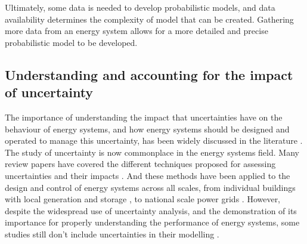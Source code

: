 Ultimately, some data is needed to develop probabilistic models, and data availability determines the complexity of model that can be created. Gathering more data from an energy system allows for a more detailed and precise probabilistic model to be developed.



\subsection{Understanding and accounting for the impact of uncertainty} \label{sec:uncertainty-methods-lit}


The importance of understanding the impact that uncertainties have on the behaviour of energy systems, and how energy systems should be designed and operated to manage this uncertainty, has been widely discussed in the literature . The study of uncertainty is now commonplace in the energy systems field. Many review papers have covered the different techniques proposed for assessing uncertainties and their impacts . And these methods have been applied to the design and control of energy systems across all scales, from individual buildings with local generation and storage , to national scale power grids .
However, despite the widespread use of uncertainty analysis, and the demonstration of its importance for properly understanding the performance of energy systems, some studies still don't include uncertainties in their modelling .\\

